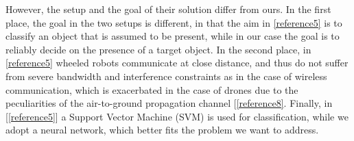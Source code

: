 \documentclass[10pt,conference,compsocconf]{IEEEtran}
\begin{document}
However, the setup and the goal of their solution differ from ours. In the first place, the goal in the two setups is different, in that the aim in \ref{reference5} is to classify an object that is assumed to be present, while in our case the goal is to reliably decide on the presence of a target object. In the second place, in \ref{reference5} wheeled robots communicate at close distance, and thus do not suffer from severe bandwidth and interference constraints as in the case of wireless communication, which is exacerbated in the case of drones due to the peculiarities of the air-to-ground propagation channel [\ref{reference8}. Finally, in [\ref{reference5}] a Support Vector Machine (SVM) is used for classification, while we adopt a neural network, which better fits the problem we want to address.
\end{document}
